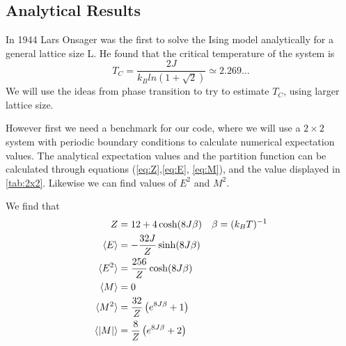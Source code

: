 \documentclass[%
reprint,
nofootinbib,
amsmath,amssymb,
aps,
]{revtex4-1}
\begin{document}
\subsection{Analytical Results} %
In 1944 Lars Onsager was the first to solve the Ising model analytically for a general lattice size L\cite{LarsOnsager}. He found that the critical temperature of the system is 
\begin{equation}
	T_C = \frac{2J}{k_Bln(1+\sqrt{2})}\simeq 2.269\dots
\end{equation} 
We will use the ideas from phase transition to try to estimate $T_C$, using larger lattice size. 

However first we need a benchmark for our code, where we will use a $2\times 2$ system with periodic boundary conditions to calculate numerical expectation values. The analytical expectation values and the partition function can be calculated through equations (\ref{eq:Z},\ref{eq:E}, \ref{eq:M}), and the value displayed in \autoref{tab:2x2}. Likewise we can find values of $E^2$ and $M^2$. 

We find that 
\begin{align}
	Z &= 12 + 4\cosh(8J\beta) && \beta = (k_BT)^{-1}\\
	\langle E\rangle &= -\frac{32J}{Z}\sinh(8J\beta)\\
	\langle E^2\rangle &= \frac{256}{Z}\cosh(8J\beta)\\
	\langle M\rangle &= 0\\
	\langle M^2\rangle &=\frac{32}{Z}\left(e^{8J\beta} + 1\right)\\
	\langle \abs{M}\rangle &= \frac{8}{Z}\left(e^{8J\beta} + 2\right)
\end{align}
\end{document}
